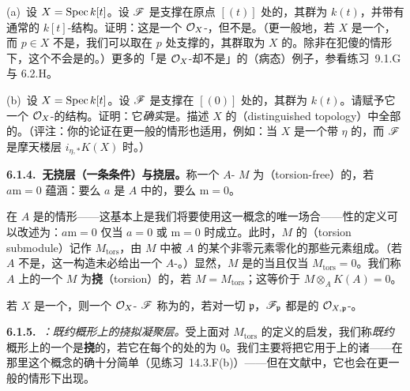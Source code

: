 (a)~设 $X=\operatorname{Spec} k[t]$。设 $\mathscr{F}$ 是支撑在原点 $[(t)]$ 处的\trSkyscraperSheaf，其群为 $k(t)$，并带有通常的 $k[t]$-\trModule{}结构。证明：这是一个 $\mathcal{O}_X$-\trModule，但不是\trQCSheaf。（更一般地，若 $X$ 是一个\trIntegral\trScheme，而 $p\in X$ 不是\trGenericPoint，我们可以取在 $p$ 处支撑的\trSkyscraperSheaf，其群取为 $X$ 的\trFunctionField。除非在犯傻的情形下，这个\trSheaf{}不会是\trQC{}的。）更多的「是 $\mathcal{O}_X$-\trModule{}却不是\trQCSheaf」的（病态）例子，参看练习~9.1.G 与 6.2.H。

(b)~设 $X=\operatorname{Spec} k[t]$。设 $\mathscr{F}$ 是支撑在\trGenericPoint{} $[(0)]$ 处的\trSkyscraperSheaf，其群为 $k(t)$。请赋予它一个 $\mathcal{O}_X$-\trModule{}的结构。证明：它\emph{确实}是\trQCSheaf。描述 $X$ 的\trDistinguishedTopology{}（distinguished topology）中全部的\trRestrictionMap。（评注：你的论证在更一般的情形也适用，例如：当 $X$ 是一个带\trGenericPoint{} $\eta$ 的\trIntegral\trScheme，而 $\mathscr{F}$ 是摩天楼层 $i_{\eta,*}K(X)$ 时。）

\textbf{6.1.4.\ 无挠层（一条\trStalkLocal{}条件）与挠层。}\quad 称一个 $A$-\trModule{} $M$ 为\textbf{\trTorsionFree}（torsion-free）的，若 $a\mathrm{m}=0$ 蕴涵：要么 $a$ 是 $A$ 中的\trZerodivisor，要么 $\mathrm{m}=0$。

在 $A$ 是\trIntegralDomain{}的情形——这基本上是我们将要使用这一概念的唯一场合——\trTorsionFree{}性的定义可以改述为：$a\mathrm{m}=0$ 仅当 $a=0$ 或 $\mathrm{m}=0$ 时成立。此时，$M$ 的\textbf{\trTorsionSubmodule{}}（torsion submodule）记作 $M_{\mathrm{tors}}$，由 $M$ 中被 $A$ 的某个非零元素零化的那些元素组成。（若 $A$ 不是\trIntegralDomain，这一构造未必给出一个 $A$-\trModule。）显然，$M$ 是\trTorsionFree{}的当且仅当 $M_{\mathrm{tors}}=0$。我们称\trIntegralDomain{} $A$ 上的一个\trModule{} $M$ 为\textbf{挠}（torsion）的，若 $M=M_{\mathrm{tors}}$；这等价于 $M\otimes_A K(A)=0$。

若 $X$ 是一个\trScheme，则一个 $\mathcal{O}_X$-\trModule{} $\mathscr{F}$ 称为\textbf{\trTorsionFree}的，若对一切 $\mathfrak{p}$，$\mathscr{F}_\mathfrak{p}$ 都是\trTorsionFree{}的 $\mathcal{O}_{X,\mathfrak{p}}$-\trModule。

\textbf{6.1.5.}\ \emph{\trhDefinition{}：既约概形上的挠拟凝聚层。}\quad 受上面对 $M_{\mathrm{tors}}$ 的定义的启发，我们称\emph{既约}概形上的一个\trQCSheaf{}是\textbf{挠}的，若它在每个\trIrreducibleComponent{}的\trGenericPoint{}处的\trStalk{}为 $0$。我们主要将把它用于\trRegular\trCurve{}上的诸\trCoherentSheaf——在那里这个概念的确十分简单（见练习~14.3.F(b)）——但在文献中，它也会在更一般的情形下出现。
